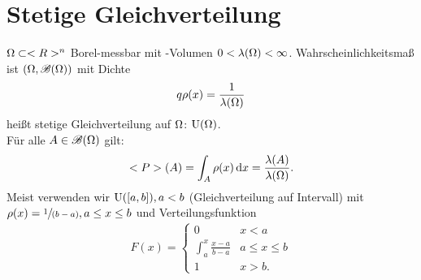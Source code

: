 \section{Stetige Gleichverteilung}

\begin{*erinnerung}
	$\Omega \subset <R>^n$ Borel-messbar mit -Volumen $0 < \lambda(\Omega) < \infty$. Wahrscheinlichkeitsmaß ist $(\Omega, \mathscr{B}(\Omega))$ mit Dichte
	\begin{align*}
	q\rho(x) = \frac{1}{\lambda(\Omega)}
	\end{align*}
	heißt stetige Gleichverteilung auf $\Omega$: $\operatorname{U}(\Omega)$.\\
	Für alle $A \in \mathscr{B}(\Omega)$ gilt:
	\begin{align*}
		<P>(A) = \int_{A} \rho(x) \,\mathrm{d} x = \frac{\lambda(A)}{\lambda(\Omega)}.
	\end{align*}
	Meist verwenden wir $\operatorname{U}([a,b]), a < b$ (Gleichverteilung auf Intervall) mit $\rho(x) = \sfrac{1}{(b-a)}, a \le x \le b$ und Verteilungsfunktion
	\begin{align*}
		F(x) = 
		\begin{cases}
			0 & x < a\\
			\int_{a}^{x} \frac{x-a}{b-a} & a \le x \le b\\
			1 & x >b.
		\end{cases}
	\end{align*}
\end{*erinnerung}